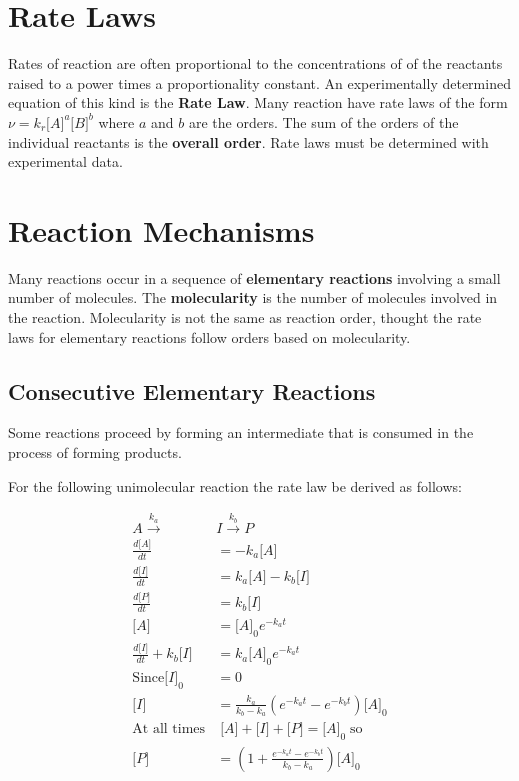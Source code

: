 \documentclass[a4paper, 12 pt]{article}
\newcommand{\conc}[1]{\lbrack #1 \rbrack}
\newcommand{\deriv}[2]{\frac{d #1}{d #2}}
\begin{document}
\begin{flushleft}
\section*{Rate Laws}

Rates of reaction are often proportional to the concentrations of of the reactants raised to a power times a proportionality constant. An experimentally determined equation of this kind is the \textbf{Rate Law}.
Many reaction have rate laws of the form $\nu = k_r \conc{A}^a \conc{B}^b$ where $a$ and $b$ are the orders. The sum of the orders of the individual reactants is the \textbf{overall order}. Rate laws must be determined with experimental data. 

\section*{Reaction Mechanisms}

Many reactions occur in a sequence of \textbf{elementary reactions} involving a small number of molecules. The \textbf{molecularity} is the number of molecules involved in the reaction. Molecularity is not the same as reaction order, thought the rate laws for elementary reactions follow orders based on molecularity.

\subsection*{Consecutive Elementary Reactions}

Some reactions proceed by forming an intermediate that is consumed in the process of forming products.

For the following unimolecular reaction the rate law be derived as follows:

\begin{equation*}
\begin{aligned}
    A \xrightarrow{k_a} &I \xrightarrow{k_b} P\\
    \deriv{\conc{A}}{t} &= -k_a \conc{A}\\
    \deriv{\conc{I}}{t} &= k_a \conc{A} - k_b \conc{I}\\
    \deriv{\conc{P}}{t} &= k_b \conc{I}\\
    \conc{A} &= \conc{A}_0 e^{-k_a t}\\
    \deriv{\conc{I}}{t} + k_b \conc{I} &= k_a \conc{A}_0 e^{-k_a t}\\
    \text{Since} \conc{I}_0 &= 0\\
    \conc{I} &= \frac{k_a}{k_b - k_a} (e^{-k_a t} - e^{-k_b t})\conc{A}_0 \\
    \text{At all times} &\; \conc{A} + \conc{I} + \conc{P} = \conc{A}_0 \; \text{so}\\
    \conc{P} &= (1 + \frac{e^{-k_a t} - e^{-k_b t}}{k_b - k_a})\conc{A}_0
\end{aligned}
\end{equation*}


\end{flushleft}
\end{document}
